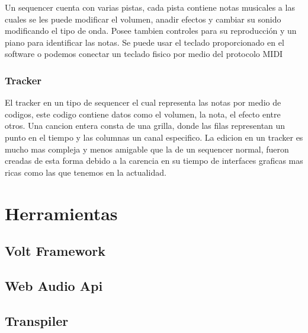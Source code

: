 Un sequencer cuenta con varias pistas, cada pista contiene notas musicales
a las cuales se les puede modificar el volumen, anadir efectos y cambiar
su sonido modificando el tipo de onda. Posee tambien controles para su
reproducción y un piano para identificar las notas. Se puede usar
el teclado proporcionado en el software o podemos conectar un teclado
fisico por medio del protocolo MIDI

\subsubsection{Tracker}

El tracker en un tipo de sequencer el cual representa las notas por medio
de codigos, este codigo contiene datos como el volumen, la nota, el efecto
entre otros. Una cancion entera consta de una grilla, donde las filas
representan un punto en el tiempo y las columnas un canal especifico.
La edicion en un tracker es mucho mas compleja y menos amigable que
la de un sequencer normal, fueron creadas de esta forma debido a la
carencia en su tiempo de interfaces graficas mas ricas como las que
tenemos en la actualidad.

\section{Herramientas}
\subsection{Volt Framework}
\subsection{Web Audio Api}
\subsection{Transpiler}
